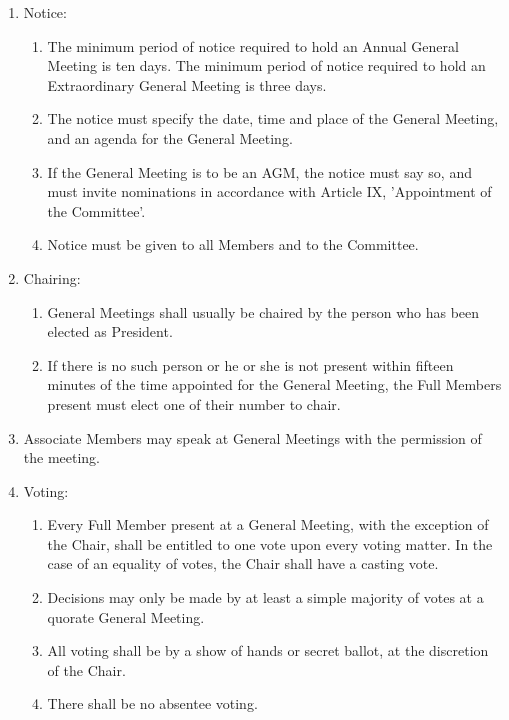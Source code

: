 \documentclass[12pt]{constitution}
\begin{document}
\begin{enumerate}
    \item Notice:
    \begin{enumerate}
        \item The minimum period of notice required to hold an Annual General Meeting is ten days.  The minimum period of notice required to hold an Extraordinary General Meeting is three days.
        \item The notice must specify the date, time and place of the General Meeting, and an agenda for the General Meeting.
        \item If the General Meeting is to be an AGM, the notice must say so, and must invite nominations in accordance with Article IX, 'Appointment of the Committee'.
        \item Notice must be given to all Members and to the Committee.
    \end{enumerate}

    \item Chairing:
    \begin{enumerate}
        \item General Meetings shall usually be chaired by the person who has been elected as President.
        \item If there is no such person or he or she is not present within fifteen minutes of the time appointed for the General Meeting, the Full Members present must elect one of their number to chair.
    \end{enumerate}

    \item Associate Members may speak at General Meetings with the permission of the meeting.

    \item Voting:
    \begin{enumerate}
        \item Every Full Member present at a General Meeting, with the exception of the Chair, shall be entitled to one vote upon every voting matter.  In the case of an equality of votes, the Chair shall have a casting vote.
        \item Decisions may only be made by at least a simple majority of votes at a quorate General Meeting.
        \item All voting shall be by a show of hands or secret ballot, at the discretion of the Chair. 
        \item There shall be no absentee voting.
    \end{enumerate}


\end{enumerate}
\end{document}
